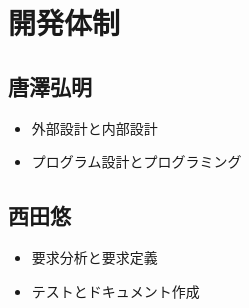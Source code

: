 \documentclass[a4paper,11pt]{jsarticle}
\begin{document}
\section{開発体制}

\subsection{唐澤弘明}
\begin{itemize}
\item 外部設計と内部設計
\item プログラム設計とプログラミング
\end{itemize}

\subsection{西田悠}
\begin{itemize}
\item 要求分析と要求定義
\item テストとドキュメント作成
\end{itemize}
\end{document}

